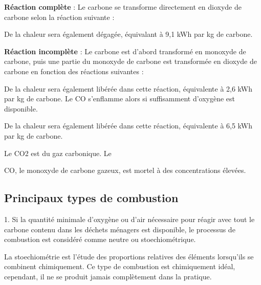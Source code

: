 \textbf{Réaction complète} : Le carbone se transforme directement en dioxyde de carbone selon la réaction suivante :
\begin{center}
  
\end{center}

\vspace{0.3cm} 

De la chaleur sera également dégagée, équivalant à 9,1 kWh par kg de carbone.
\vspace{0.3cm}
\vspace{0.3cm}

\textbf{Réaction incomplète} : Le carbone est d'abord transformé en monoxyde de carbone, puis une partie du monoxyde de carbone est transformée en dioxyde de carbone en fonction des réactions suivantes :

\begin{center}
\end{center}
\vspace{0.3cm} 

De la chaleur sera également libérée dans cette réaction, équivalente à 2,6 kWh par kg de carbone. Le CO s'enflamme alors si suffisamment d'oxygène est disponible. 

\begin{center}
\end{center}


\vspace{0.3cm} 

De la chaleur sera également libérée dans cette réaction, équivalente à 6,5 kWh par kg de carbone.

Le CO2 est du gaz carbonique.
\vspace{0.3cm} Le

CO, le monoxyde de carbone gazeux, est mortel à des concentrations élevées.


\subsection{Principaux types de combustion}


1. Si la quantité minimale d'oxygène ou d'air nécessaire pour réagir avec tout le carbone contenu dans les déchets ménagers est disponible, le processus de combustion est considéré comme neutre ou stoechiométrique.
\vspace{0.3cm} 

La stoechiométrie est l'étude des proportions relatives des éléments lorsqu'ils se combinent chimiquement. Ce type de combustion est chimiquement idéal, cependant, il ne se produit jamais complètement dans la pratique.

